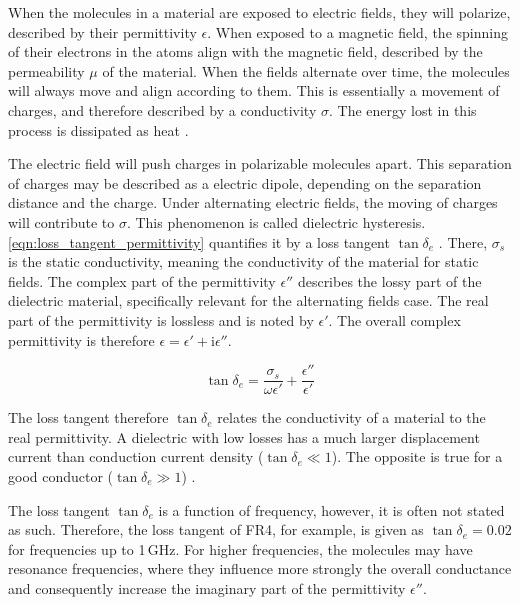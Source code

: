 


When the molecules in a material are exposed to electric fields, they will polarize, described by their permittivity $\epsilon$. When exposed to a magnetic field, the spinning of their electrons in the atoms align with the magnetic field, described by the permeability $\mu$ of the material. When the fields alternate over time, the molecules will always move and align according to them. This is essentially a movement of charges, and therefore described by a conductivity $\sigma$. The energy lost in this process is dissipated as heat \cite{Balanis_2012}.

The electric field will push charges in polarizable molecules apart. This separation of charges may be described as a electric dipole, depending on the separation distance and the charge. Under alternating electric fields, the moving of charges will contribute to $\sigma$. This phenomenon is called dielectric hysteresis. \autoref{eqn:loss_tangent_permittivity} quantifies it by a loss tangent $\tan\delta_e$ \cite{Balanis_2012}. There, $\sigma_s$ is the static conductivity, meaning the conductivity of the material for static fields. The complex part of the permittivity $\epsilon''$ describes the lossy part of the dielectric material, specifically relevant for the alternating fields case. The real part of the permittivity is lossless and is noted by $\epsilon'$. The overall complex permittivity is therefore $\epsilon=\epsilon'+\mathrm{i}\epsilon''$.

\begin{equation}
    \tan\delta_e = \frac{\sigma_s}{\omega\epsilon'}+\frac{\epsilon''}{\epsilon'}
    \label{eqn:loss_tangent_permittivity}
\end{equation}

The loss tangent therefore $\tan\delta_e$ relates the conductivity of a material to the real permittivity. A dielectric with low losses has a much larger displacement current than conduction current density ($\tan\delta_e \ll 1$). The opposite is true for a good conductor ($\tan\delta_e \gg 1$) \cite{Balanis_2012}.

The loss tangent $\tan\delta_e$ is a function of frequency, however, it is often not stated as such. Therefore, the loss tangent of FR4, for example, is given as $\tan\delta_e=0.02$ for frequencies up to 1\,GHz. For higher frequencies, the molecules may have resonance frequencies, where they influence more strongly the overall conductance and consequently increase the imaginary part of the permittivity $\epsilon''$.

